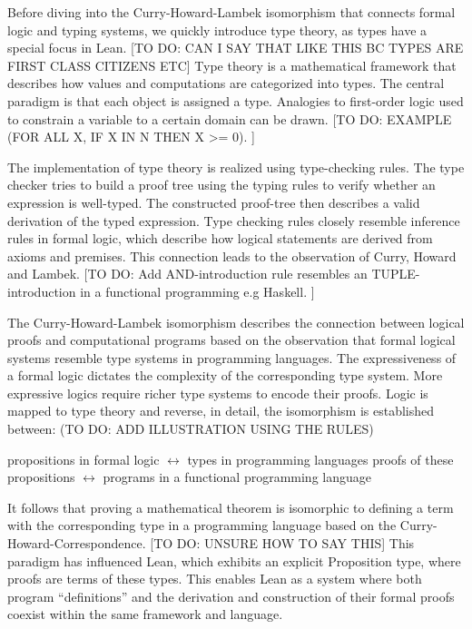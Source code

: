 Before diving into the Curry-Howard-Lambek isomorphism that connects formal logic and typing systems, we quickly introduce type theory, as types have a special focus in Lean. [TO DO: CAN I SAY THAT LIKE THIS BC TYPES ARE FIRST CLASS CITIZENS ETC] \newline 
Type theory is a mathematical framework that describes how values and computations are categorized into types. The central paradigm is that each object is assigned a type. Analogies to first-order logic  used to constrain a variable to a certain domain can be drawn. 
[TO DO: EXAMPLE (FOR ALL X, IF X IN N THEN X >= 0). ]

The implementation of type theory is realized using type-checking rules. The type checker tries to build  a proof tree using the typing rules to verify whether an expression is well-typed. The constructed proof-tree then describes a valid derivation of the typed expression. Type checking rules closely resemble inference rules in formal logic, which describe how logical statements are derived from axioms and premises. This connection leads to the observation of Curry, Howard and Lambek.
[TO DO: Add AND-introduction rule resembles an TUPLE-introduction in a functional programming e.g Haskell. ] 

The Curry-Howard-Lambek isomorphism describes the connection between logical proofs and computational programs based on the observation that formal logical systems resemble type systems in programming languages. The expressiveness of a formal logic dictates the complexity of the corresponding type system. More expressive logics require richer type systems to encode their proofs. Logic is mapped to type theory and reverse, in detail, the isomorphism is established between: (TO DO: ADD ILLUSTRATION USING THE RULES)

propositions in formal logic $\leftrightarrow$  types in programming languages
proofs of these propositions $\leftrightarrow$  programs in a functional programming language 

It follows that proving a mathematical theorem is isomorphic to defining a term with the corresponding type in a programming language based on the Curry-Howard-Correspondence. [TO DO: UNSURE HOW TO SAY THIS] This paradigm has influenced Lean, which exhibits an explicit Proposition type, where proofs are terms of these types. This enables Lean as a system where both program “definitions” and the derivation and construction of their formal proofs coexist within the same framework and language.

